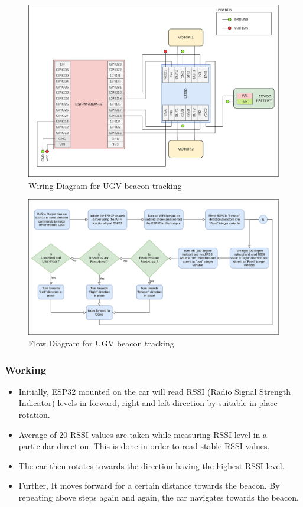 \begin{figure}[h!]
\centering
\includegraphics[width=\columnwidth]{./Figures/Wiring_UGV_beacon.png}
\caption{Wiring Diagram for UGV beacon tracking}
\label{Wiring_UGV_beacon}
\end{figure}

\begin{figure}[h!]
\centering
\includegraphics[width=\columnwidth]{./Figures/Flow_UGV_beacon.png}
\caption{Flow Diagram for UGV beacon tracking}
\label{Flow_UGV_beacon}
\end{figure}

\subsubsection{Working}
\begin{itemize}
    \item Initially, ESP32 mounted on the car will read RSSI (Radio Signal Strength Indicator) levels in forward, right and left direction by suitable in-place rotation.
    \item Average of 20 RSSI values are taken while measuring RSSI level in a particular direction. This is done in order to read stable RSSI
    values.
    \item The car then rotates towards the direction having the highest RSSI level.
    \item Further, It moves forward for a certain distance towards the beacon. By repeating above steps again and again, the car navigates towards the beacon.
\end{itemize}

